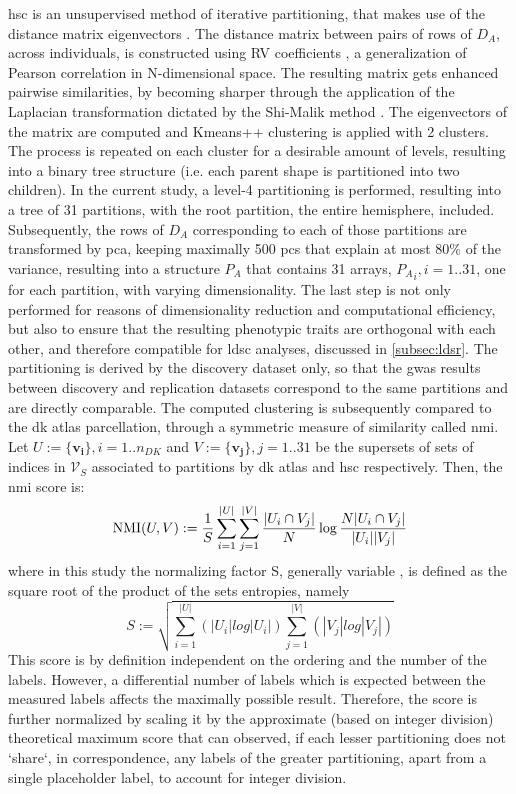 \Ac{hsc} is an unsupervised method of iterative partitioning, that makes use of the distance matrix eigenvectors \cite{Ng2002}. The distance matrix between pairs of rows of $D_A$, across individuals, is constructed using RV coefficients \cite{Robert1976}, a generalization of Pearson correlation in N-dimensional space. The resulting matrix gets enhanced pairwise similarities, by becoming sharper through the application of the Laplacian transformation dictated by the Shi-Malik method \cite{Shi2000}. The eigenvectors of the matrix are computed and Kmeans++ clustering \cite{Arthur2007} is applied with 2 clusters. The process is repeated on each cluster for a desirable amount of levels, resulting into a binary tree structure (i.e. each parent shape is partitioned into two children). In the current study, a level-4 partitioning is performed, resulting into a tree of 31 partitions, with the root partition, the entire hemisphere, included. Subsequently, the rows of $D_A$ corresponding to each of those partitions are transformed by \ac{pca}, keeping maximally 500 \acp{pc} that explain at most 80\% of the variance, resulting into a structure $P_A$ that contains 31 arrays, ${P_A}_i,i=1..31$, one for each partition, with varying dimensionality. The last step is not only performed for reasons of dimensionality reduction and computational efficiency, but also to ensure that the resulting phenotypic traits are orthogonal with each other, and therefore compatible for \ac{ldsc} analyses, discussed in \autoref{subsec:ldsr}. The partitioning is derived by the discovery dataset only, so that the \ac{gwas} results between discovery and replication datasets correspond to the same partitions and are directly comparable. The computed clustering is subsequently compared to the \ac{dk} atlas parcellation, through a symmetric measure of similarity called \ac{nmi}. Let $U:=\{\mathbf{v_i}\},i=1..n_{DK}$ and $V:=\{\mathbf{{v_j}}\},j=1..31$ be the supersets of sets of indices in $\mathcal{V}_S$ associated to partitions by \ac{dk} atlas and  \ac{hsc} respectively. Then, the \ac{nmi} score is:
$$
\operatorname*{NMI}(U,V):=\frac{1}{S}\sum_{i=1}^{|U|} \sum_{j=1}^{|V|} \frac{|U_i\cap V_j|}{N}
\log\frac{N|U_i \cap V_j|}{|U_i||V_j|}
$$
where in this study the normalizing factor S, generally variable \cite{Strehl2003}, is defined as the square root of the product of the sets entropies, namely  
$$
S:=\sqrt{\sum_{i=1}^{|U|}\left(|U_i|log|U_i|\right)\sum_{j=1}^{|V|}\left(|V_j|log|V_j|\right)}
$$
This score is by definition independent on the ordering and the number of the labels. However, a differential number of labels which is expected between the measured labels affects the maximally possible result. Therefore, the score is further normalized by scaling it by the approximate (based on integer division) theoretical maximum score that can observed, if each lesser partitioning does not `share`, in correspondence, any labels of the greater partitioning, apart from a single placeholder label, to account for integer division.
